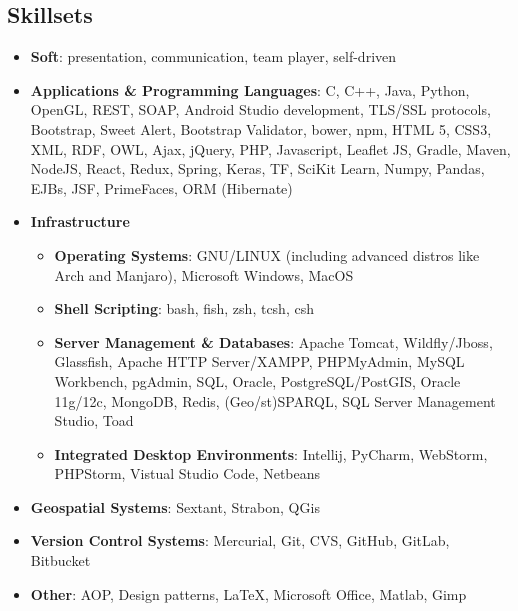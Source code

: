 \documentclass[a4paper,oneside,10pt]{article}
\begin{document}
\subsection*{Skillsets}

	\begin{itemize}

		\item \textbf{Soft}: presentation, communication, team player, self-driven

		\item \textbf{Applications \& Programming Languages}: C, C++, Java, Python, OpenGL, REST, SOAP, Android Studio development, TLS/SSL protocols, Bootstrap, Sweet Alert, Bootstrap Validator, bower, npm, HTML 5, CSS3, XML, RDF, OWL, Ajax, jQuery, PHP, Javascript, Leaflet JS, Gradle, Maven, NodeJS, React, Redux, Spring, Keras, TF, SciKit Learn, Numpy, Pandas, EJBs, JSF, PrimeFaces, ORM (Hibernate)

		\item \textbf{Infrastructure} 

			\begin{itemize}
				\item \textbf{Operating Systems}: GNU/LINUX (including advanced distros like Arch and Manjaro), Microsoft Windows, MacOS 

				\item \textbf{Shell Scripting}: bash, fish, zsh, tcsh, csh

				\item \textbf{Server Management \& Databases}: Apache Tomcat, Wildfly/Jboss, Glassfish, Apache HTTP Server/XAMPP, PHPMyAdmin, MySQL Workbench, pgAdmin, SQL, Oracle, PostgreSQL/PostGIS, Oracle 11g/12c, MongoDB, Redis, (Geo/st)SPARQL, SQL Server Management Studio, Toad

				\item \textbf{Integrated Desktop Environments}: Intellij, PyCharm, WebStorm, PHPStorm, Vistual Studio Code, Netbeans

			\end{itemize}

		\item \textbf{Geospatial Systems}: Sextant, Strabon, QGis

		\item \textbf{Version Control Systems}: Mercurial, Git, CVS, GitHub, GitLab, Bitbucket

		\item \textbf{Other}: AOP, Design patterns, \LaTeX, Microsoft Office, Matlab, Gimp

	\end{itemize}
\end{document}
